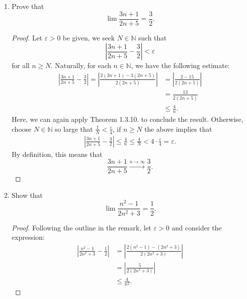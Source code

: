 \documentclass[12pt, reqno]{article}
\numberwithin{equation}{section}
\theoremstyle{definition}
\theoremstyle{remark}
\newcommand{\NN}{\mathbb{N}}
\newcommand{\abs}[1]{\left\lvert#1\right\rvert}
\renewcommand{\epsilon}{\varepsilon}
\begin{document}
\begin{enumerate}[leftmargin=*]
\begin{proof}
		      Alternatively, by the Archimedean property, we can find $N \in \NN$ such that $N > \frac{2}{\epsilon}$. Then, for all $n \geq N$ there holds
		      \[
			      \frac{2}{n} \leq \frac{2}{N} < 2 \cdot \frac{\epsilon}{2} = \epsilon.
		      \]
		      Hence, if $n \geq N$, we see that
		      \[
			      \abs{ \frac{2n}{n+1} - 2 } \leq  \frac{2}{n} < \epsilon,
		      \]
		      which is what had to be shown.
	      \end{proof}
	\item Prove that\[
		      \lim\frac{3n+1}{2n+5} = \frac{3}{2}.
	      \]
	      \begin{proof}
		      Let $\epsilon > 0$ be given, we seek $N \in \NN$ such that\[
			      \abs{ \frac{3n+1}{2n+5} - \frac{3}{2} } < \epsilon
		      \]
		      for all $n \geq N$. Naturally, for each $n \in \NN$, we have the following estimate:
		      \begin{align*}
			      \abs{ \frac{3n+1}{2n+5} - \frac{3}{2} } = \abs{ \frac{2(3n+1) - 3(2n+5)}{2(2n+5)}}
			       & = \abs{ \frac{2-15}{2(2n+5)} } \\
			       & = \frac{13}{2(2n+5)}           \\
			       & \leq \frac{4}{n}.
		      \end{align*}
		      Here, we can again apply Theorem 1.3.10. to conclude the result. Otherwise, choose $N \in \NN$ so large that $\frac{1}{N} < \frac{\epsilon}{4}$, if $n \geq N$ the above implies that
		      \begin{align*}
			      \abs{ \frac{3n+1}{2n+5} - \frac{3}{2} }  \leq \frac{4}{n} \leq \frac{4}{N} < 4 \cdot \frac{\epsilon}{4} = \epsilon.
		      \end{align*}
		      By definition, this means that
		      \[
			      \frac{3n+1}{2n+5}\xrightarrow{ n \to \infty} \frac{3}{2}.
		      \]
	      \end{proof}
	\item Show that\[
		      \lim{ \frac{n^2-1}{2n^2 + 3}}=  \frac{1}{2}.
	      \]
	      \begin{proof}
		      Following the outline in the remark, let $\epsilon > 0$ and consider the expression:
		      \begin{align*}
			      \abs{ \frac{n^2-1}{2n^2 + 3} - \frac{1}{2}} & = \abs{ \frac{2(n^2 - 1) - (2n^2+3)}{2(2n^2+3)} } \\
			                                                  & = \abs{ \frac{5}{2(2n^2 + 3)} }                   \\
			                                                  & \leq \frac{4}{n^2}.

\end{align*}
\end{proof}
\end{enumerate}
\end{document}
